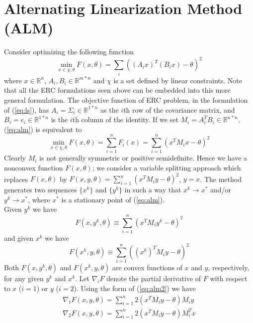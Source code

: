 {\section{Alternating Linearization Method (ALM)}
Consider optimizing the following function
\begin{equation}\label{eq:alm}
\min_{x \in \chi, \theta} F(x,\theta) = \sum_{i} ((A_i x)^T(B_i x) -\theta)^2
\end{equation}
where $x \in \mathbb{R}^n $, $A_i, B_i \in \mathbb{R}^{m * n} $ and $\chi$ is a set defined by linear constraints. Note that all the ERC formulations seen above can be embedded into this more general formulation. The objective function of ERC problem, in the formulation of (\ref{eq:ls}), has $A_i = \Sigma_i \in \mathbb{R}^{1 * n} $ as the $i$th row of the covariance matrix, and $B_i = e_i \in \mathbb{R}^{1 * n} $ is the $i$th column of the identity. If we set $M_i = A_i^TB_i \in \mathbb{R}^{n * n}$, (\ref{eq:alm}) is equivalent to
\begin{equation}\label{eq:alm2}
\min_{x \in \chi, \theta} F(x,\theta) = \sum_{i=1}^n F_i(x) = \sum_{i=1}^n (x^TM_ix - \theta)^2
\end{equation}
Clearly $M_i$ is not generally symmetric or positive semidefinite. Hence we have a nonconvex function $F(x,\theta)$; we consider a variable splitting approach which replaces $F(x,\theta)$ by $F(x,y,\theta) = \sum_{i=1}^n (x^TM_iy - \theta)^2$, $y=x$. The method generates two sequences $\{x^k\}$ and $\{y^k\}$ in such a way that $x^k \rightarrow x^*$ and/or $y^k \rightarrow x^*$, where $x^*$ is a stationary point of (\ref{eq:alm}).\\
Given $y^k$ we have
\begin{equation}
F(x,y^k,\theta) \equiv \sum_{i=1}^n (x^TM_iy^k - \theta)^2
\end{equation}
and given $x^k$ we have
\begin{equation}
F(x^k,y,\theta) \equiv \sum_{i=1}^n ((x^k)^TM_iy - \theta)^2
\end{equation}
Both $F(x,y^k,\theta)$ and $F(x^k,y,\theta)$ are convex functions of $x$ and $y$, respectively, for any given $y^k$ and $x^k$. Let $\nabla_iF$ denote the partial derivative of $F$ with respect to $x$ ($i=1$) or $y$ ($i=2$). Using the form of (\ref{eq:alm2}) we have
\begin{equation}
\begin{split}
\nabla_1F(x,y,\theta) = \sum_{i=1}^n 2(x^TM_iy-\theta)M_iy \\
\nabla_2F(x,y,\theta) = \sum_{i=1}^n 2(x^TM_iy-\theta)M_i^Tx

\end{split}
\end{equation}}
